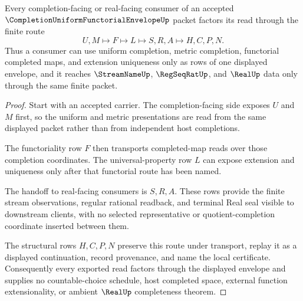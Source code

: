 \begin{theorem}
\label{thm:completion-uniform-functorial-envelope-consumer-handoff}
Every completion-facing or real-facing consumer of an accepted $\CompletionUniformFunctorialEnvelopeUp$ packet factors its read through the finite route
$$
U,M \longmapsto F \longmapsto L \longmapsto S,R,A \longmapsto H,C,P,N .
$$
Thus a consumer can use uniform completion, metric completion, functorial completed maps, and extension uniqueness only as rows of one displayed envelope, and it reaches $\StreamNameUp$, $\RegSeqRatUp$, and $\RealUp$ data only through the same finite packet.
\end{theorem}
\begin{proof}
Start with an accepted carrier. The completion-facing side exposes $U$ and $M$ first, so the uniform and metric presentations are read from the same displayed packet rather than from independent host completions.

The functoriality row $F$ then transports completed-map reads over those completion coordinates. The universal-property row $L$ can expose extension and uniqueness only after that functorial route has been named.

The handoff to real-facing consumers is $S,R,A$. These rows provide the finite stream observations, regular rational readback, and terminal Real seal visible to downstream clients, with no selected representative or quotient-completion coordinate inserted between them.

The structural rows $H,C,P,N$ preserve this route under transport, replay it as a displayed continuation, record provenance, and name the local certificate. Consequently every exported read factors through the displayed envelope and supplies no countable-choice schedule, host completed space, external function extensionality, or ambient $\RealUp$ completeness theorem.
\end{proof}


